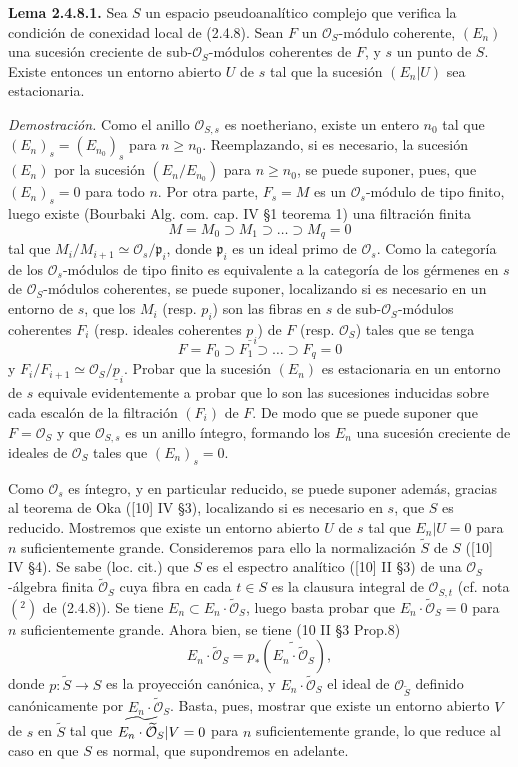 \textbf{Lema 2.4.8.1.} Sea $S$ un espacio pseudoanalítico complejo que verifica la condición de conexidad local de (2.4.8). Sean $F$ un $\mathcal O_S$-módulo coherente, $(E_n)$ una sucesión creciente de sub-$\mathcal O_S$-módulos coherentes de $F$, y $s$ un punto de $S$. Existe entonces un entorno abierto $U$ de $s$ tal que la sucesión $(E_n|U)$ sea estacionaria.

\emph{Demostración.} Como el anillo $\mathcal O_{S,s}$ es noetheriano, existe un entero $n_0$ tal que $(E_n)_s=(E_{n_0})_s$ para $n\geq n_0$. Reemplazando, si es necesario, la sucesión $(E_n)$ por la sucesión $(E_n/E_{n_0})$ para $n\geq n_0$, se puede suponer, pues, que $(E_n)_s=0$ para todo $n$. Por otra parte, $F_s=M$ es un $\mathcal O_s$-módulo de tipo finito, luego existe (Bourbaki Alg. com. cap. IV \S1 teorema 1) una filtración finita
\[
 M=M_0\supset M_1\supset\ldots\supset M_q=0
\]
tal que $M_i/M_{i+1}\simeq \mathcal O_s/\mathfrak p_i$, donde $\mathfrak p_i$ es un ideal primo de $\mathcal O_s$. Como la categoría de los $\mathcal O_s$-módulos de tipo finito es equivalente a la categoría de los gérmenes en $s$ de $\mathcal O_S$-módulos coherentes, se puede suponer, localizando si es necesario en un entorno de $s$, que los $M_i$ (resp. $p_i$) son las fibras en $s$ de sub-$\mathcal O_S$-módulos coherentes $F_i$ (resp. ideales coherentes $\underline p_i$) de $F$ (resp. $\mathcal O_S$) tales que se tenga
\[
 F=F_0\supset F_1\supset\ldots\supset F_q=0
\]
y $F_i/F_{i+1}\simeq\mathcal O_S/\underline p_i$. Probar que la sucesión $(E_n)$ es estacionaria en un entorno de $s$ equivale evidentemente a probar que lo son las sucesiones inducidas sobre cada escalón de la filtración $(F_i)$ de $F$. De modo que se puede suponer que $F=\mathcal O_S$ y que $\mathcal O_{S,s}$ es un anillo íntegro, formando los $E_n$ una sucesión creciente de ideales de $\mathcal O_S$ tales que $(E_n)_s=0$.

Como $\mathcal O_s$ es íntegro, y en particular reducido, se puede suponer además, gracias al teorema de Oka ([10] IV \S3), localizando si es necesario en $s$, que $S$ es reducido. Mostremos que existe un entorno abierto $U$ de $s$ tal que $E_n|U=0$ para $n$ suficientemente grande. Consideremos para ello la normalización $\widetilde S$ de $S$ ([10] IV \S4). Se sabe (loc. cit.) que $S$ es el espectro analítico ([10] II \S3) de una $\mathcal O_S$-álgebra finita $\widetilde{\mathcal O}_S$ cuya fibra en cada $t\in S$ es la clausura integral de $\mathcal O_{S,t}$ (cf. nota $(^2)$ de (2.4.8)). Se tiene $E_n\subset E_n\cdot\widetilde{\mathcal O}_S$, luego basta probar que $E_n\cdot\widetilde{\mathcal O}_S=0$ para $n$ suficientemente grande. Ahora bien, se tiene (10 II \S3 Prop.8)
\[
 E_n\cdot\widetilde{\mathcal O}_S = p_*(\widetilde{E_n\cdot\widetilde{\mathcal O}_S}),
\]
donde $p:\widetilde S\longrightarrow S$ es la proyección canónica, y $E_n\cdot\widetilde{\mathcal O}_S$ el ideal de $\mathcal O_{\widetilde S}$ definido canónicamente por $E_n\cdot\widetilde{\mathcal O}_S$. Basta, pues, mostrar que existe un entorno abierto $V$ de $s$ en $\widetilde S$ tal que $\widetilde{E_n\cdot\widetilde{\mathcal O}_S}|\sisi{U}{V}=0$ para $n$ suficientemente grande, lo que reduce al caso en que $S$ es normal, que supondremos en adelante.


